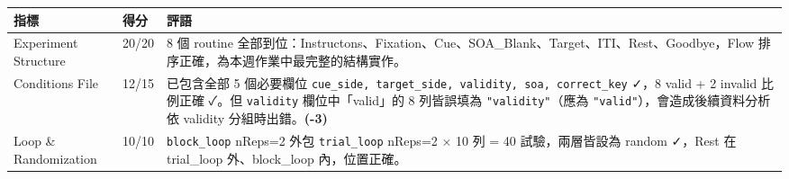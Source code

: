 \documentclass[14pt,]{extarticle}
\begin{document}
\begin{longtable}[]{@{}lll@{}}
\toprule
\begin{minipage}[b]{0.09\columnwidth}\raggedright
指標\strut
\end{minipage} & \begin{minipage}[b]{0.09\columnwidth}\raggedright
得分\strut
\end{minipage} & \begin{minipage}[b]{0.09\columnwidth}\raggedright
評語\strut
\end{minipage}\tabularnewline
\midrule
\endhead
\begin{minipage}[t]{0.09\columnwidth}\raggedright
Experiment Structure\strut
\end{minipage} & \begin{minipage}[t]{0.09\columnwidth}\raggedright
20/20\strut
\end{minipage} & \begin{minipage}[t]{0.09\columnwidth}\raggedright
8 個 routine
全部到位：Instructons、Fixation、Cue、SOA\_Blank、Target、ITI、Rest、Goodbye，Flow
排序正確，為本週作業中最完整的結構實作。\strut
\end{minipage}\tabularnewline
\begin{minipage}[t]{0.09\columnwidth}\raggedright
Conditions File\strut
\end{minipage} & \begin{minipage}[t]{0.09\columnwidth}\raggedright
12/15\strut
\end{minipage} & \begin{minipage}[t]{0.09\columnwidth}\raggedright
已包含全部 5 個必要欄位
\texttt{cue\_side,\ target\_side,\ validity,\ soa,\ correct\_key} ✓，8
valid + 2 invalid 比例正確 ✓。但 \texttt{validity} 欄位中「valid」的 8
列皆誤填為 \texttt{"validity"}（應為
\texttt{"valid"}），會造成後續資料分析依 validity
分組時出錯。\textbf{(-3)}\strut
\end{minipage}\tabularnewline
\begin{minipage}[t]{0.09\columnwidth}\raggedright
Loop \& Randomization\strut
\end{minipage} & \begin{minipage}[t]{0.09\columnwidth}\raggedright
10/10\strut
\end{minipage} & \begin{minipage}[t]{0.09\columnwidth}\raggedright
\texttt{block\_loop} nReps=2 外包 \texttt{trial\_loop} nReps=2 × 10 列 =
40 試驗，兩層皆設為 random ✓，Rest 在 trial\_loop 外、block\_loop
內，位置正確。\strut
\end{minipage}\tabularnewline

\end{longtable}
\end{document}
